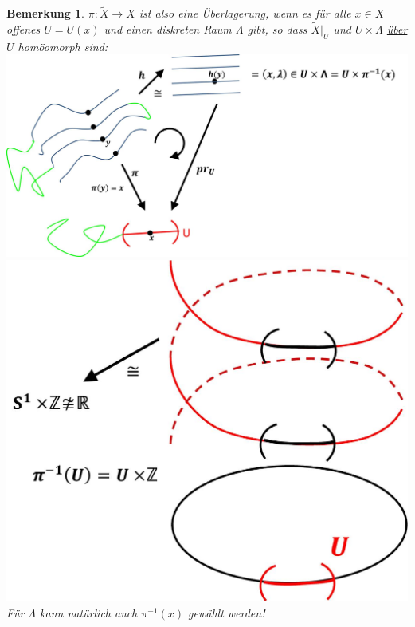 \documentclass[a4paper,11pt,notitlepage]{report}
\newtheorem{remark}{Bemerkung}[chapter]
\begin{document}
\begin{remark}
	$\pi \colon \tilde{X} \rightarrow X$ ist also eine Überlagerung, wenn es für alle $x \in X$ offenes $U=U(x)$ und einen diskreten Raum $\Lambda$ gibt, so dass $\tilde{X} \big |_U$ und $U \times \Lambda$ \underline{über $U$} homöomorph sind:
	\includegraphics[scale=0.4]{images/lokal_trivialisierend.jpg} \newline
	\includegraphics[scale=0.4]{images/lokal_trivialisierend2.jpg} \newline
	Für $\Lambda$ kann natürlich auch $\pi^{-1}(x)$ gewählt werden!
\end{remark}
\end{document}
